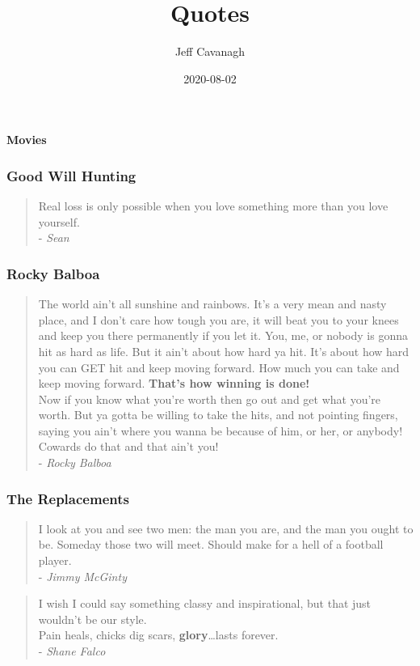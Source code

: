 \documentclass[]{article}
\title{Quotes}
\author{Jeff Cavanagh}
\date{2020-08-02}
\begin{document}
\maketitle

\textbf{Movies}

\hypertarget{good-will-hunting}{%
\subsubsection{Good Will Hunting}\label{good-will-hunting}}

\begin{quote}
Real loss is only possible when you love something more than you love
yourself.\\
- \emph{Sean}
\end{quote}

\hypertarget{rocky-balboa}{%
\subsubsection{Rocky Balboa}\label{rocky-balboa}}

\begin{quote}
The world ain't all sunshine and rainbows. It's a very mean and nasty
place, and I don't care how tough you are, it will beat you to your
knees and keep you there permanently if you let it. You, me, or nobody
is gonna hit as hard as life. But it ain't about how hard ya hit. It's
about how hard you can GET hit and keep moving forward. How much you can
take and keep moving forward. \textbf{That's how winning is done!}\\
Now if you know what you're worth then go out and get what you're worth.
But ya gotta be willing to take the hits, and not pointing fingers,
saying you ain't where you wanna be because of him, or her, or anybody!
Cowards do that and that ain't you!\\
- \emph{Rocky Balboa}
\end{quote}

\hypertarget{the-replacements}{%
\subsubsection{The Replacements}\label{the-replacements}}

\begin{quote}
I look at you and see two men: the man you are, and the man you ought to
be. Someday those two will meet. Should make for a hell of a football
player.\\
- \emph{Jimmy McGinty}
\end{quote}

\begin{quote}
I wish I could say something classy and inspirational, but that just
wouldn't be our style.\\
Pain heals, chicks dig scars, \textbf{glory}\ldots{}lasts forever.\\
- \emph{Shane Falco}
\end{quote}
\end{document}
